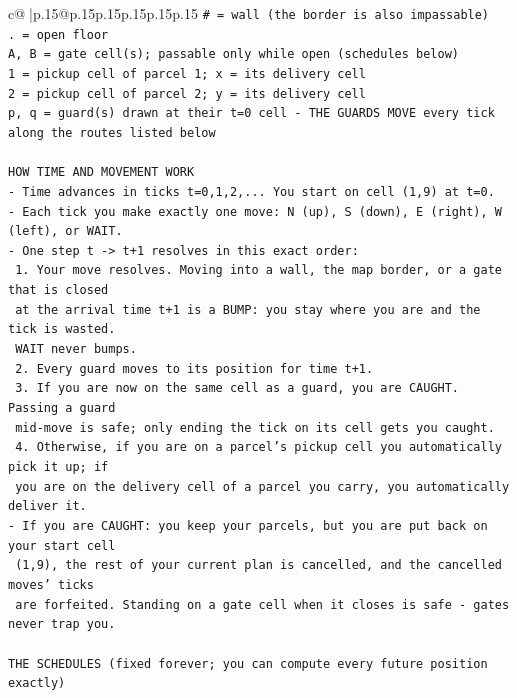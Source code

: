 \documentclass{article}
\begin{document}
{\begin{supertabular}{c@{$\;$}|p{.15\linewidth}@{}p{.15\linewidth}p{.15\linewidth}p{.15\linewidth}p{.15\linewidth}p{.15\linewidth}}
{{{\texttt{\# = wall (the border is also impassable)} \\
\texttt{. = open floor} \\
\texttt{A, B = gate cell(s); passable only while open (schedules below)} \\
\texttt{1 = pickup cell of parcel 1; x = its delivery cell} \\
\texttt{2 = pickup cell of parcel 2; y = its delivery cell} \\
\texttt{p, q = guard(s) drawn at their t=0 cell {-} THE GUARDS MOVE every tick along the routes listed below} \\
\\ 
\texttt{HOW TIME AND MOVEMENT WORK} \\
\texttt{{-} Time advances in ticks t=0,1,2,... You start on cell (1,9) at t=0.} \\
\texttt{{-} Each tick you make exactly one move: N (up), S (down), E (right), W (left), or WAIT.} \\
\texttt{{-} One step t {-}> t+1 resolves in this exact order:} \\
\texttt{  1. Your move resolves. Moving into a wall, the map border, or a gate that is closed} \\
\texttt{     at the arrival time t+1 is a BUMP: you stay where you are and the tick is wasted.} \\
\texttt{     WAIT never bumps.} \\
\texttt{  2. Every guard moves to its position for time t+1.} \\
\texttt{  3. If you are now on the same cell as a guard, you are CAUGHT. Passing a guard} \\
\texttt{     mid{-}move is safe; only ending the tick on its cell gets you caught.} \\
\texttt{  4. Otherwise, if you are on a parcel's pickup cell you automatically pick it up; if} \\
\texttt{     you are on the delivery cell of a parcel you carry, you automatically deliver it.} \\
\texttt{{-} If you are CAUGHT: you keep your parcels, but you are put back on your start cell} \\
\texttt{  (1,9), the rest of your current plan is cancelled, and the cancelled moves' ticks} \\
\texttt{  are forfeited. Standing on a gate cell when it closes is safe {-} gates never trap you.} \\
\\ 
\texttt{THE SCHEDULES (fixed forever; you can compute every future position exactly)} \\
}}}
\end{supertabular}}
\end{document}
